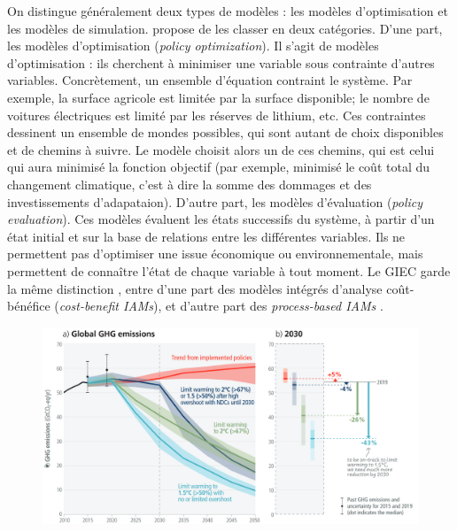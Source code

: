 On distingue généralement deux types de modèles : les modèles d'optimisation et les modèles de simulation.  
\textcite{nordhaus_dice_2013} propose de les classer en deux catégories. D'une part, les modèles d'optimisation (\emph{policy optimization}). Il s'agit de modèles d'optimisation : ils cherchent à minimiser une variable sous contrainte d'autres variables. Concrètement, un ensemble d'équation contraint le système. Par exemple, la surface agricole est limitée par la surface disponible; le nombre de voitures électriques est limité par les réserves de lithium, etc. Ces contraintes dessinent un ensemble de mondes possibles, qui sont autant de choix disponibles et de chemins à suivre. Le modèle choisit alors un de ces chemins, qui est celui qui aura minimisé la fonction objectif (par exemple, minimisé le coût total du changement climatique, c'est à dire la somme des dommages et des investissements d'adapataion). D'autre part, les modèles d'évaluation (\emph{policy evaluation}). Ces modèles évaluent les états successifs du système, à partir d'un état initial et sur la base de relations entre les différentes variables. Ils ne permettent pas d'optimiser une issue économique ou environnementale, mais permettent de connaître l'état de chaque variable à tout moment. 
Le \Gls{GIEC} garde la même distinction , entre d'une part des modèles intégrés d'analyse coût-bénéfice (\emph{cost-benefit IAMs}), et d'autre part des \emph{process-based IAMs} \autocite{intergovernmental_panel_on_climate_change_ipcc_annex_2023}.



\begin{figure}
    \centering
    \includegraphics[width=0.9\linewidth]{figures/spm2_5.png}
    \label{fig:ipcc-pathways}
\end{figure}

